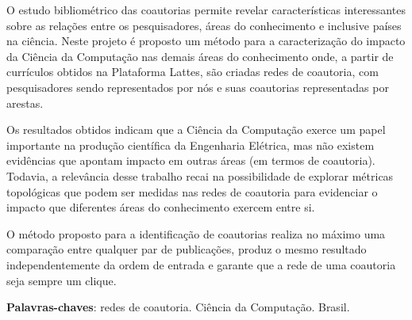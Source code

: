 
\setlength{\absparsep}{18pt} %
\begin{resumo}
    O estudo bibliométrico das coautorias permite revelar características interessantes sobre as relações entre os pesquisadores, áreas do conhecimento e inclusive países na ciência. Neste projeto é proposto um método para a caracterização do impacto da Ciência da Computação nas demais áreas do conhecimento onde, a partir de currículos obtidos na Plataforma Lattes, são criadas redes de coautoria, com pesquisadores sendo representados por nós e suas coautorias representadas por arestas.
    
    Os resultados obtidos indicam que a Ciência da Computação exerce um papel importante na produção científica da Engenharia Elétrica, mas não existem evidências que apontam impacto em outras áreas (em termos de coautoria). Todavia, a relevância desse trabalho recai na possibilidade de explorar métricas topológicas que podem ser medidas nas redes de coautoria para evidenciar o impacto que diferentes áreas do conhecimento exercem entre si.
    
    O método proposto para a identificação de coautorias realiza no máximo uma comparação entre qualquer par de publicações, produz o mesmo resultado independentemente da ordem de entrada e garante que a rede de uma coautoria seja sempre um clique.
    
    \textbf{Palavras-chaves}: redes de coautoria. Ciência da Computação. Brasil.
\end{resumo}
